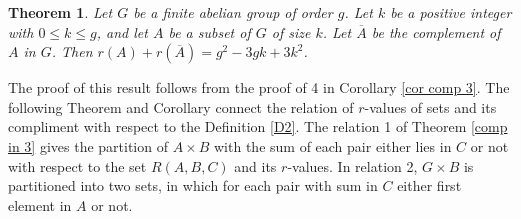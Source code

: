 \documentclass[12pt,a4paper]{article}
\newtheorem{thm}{Theorem}[section]
\begin{document}
	\begin{thm}\label{compliment}
		\cite{HUCZYNSKA2009831} Let $ G $ be a finite abelian group of order $ g $. Let $ k $ be a positive integer with $ 0\leq k\leq g $, and let $ A $
		be a subset of $ G $ of size $k $. Let $ \overline{A} $ be the complement of $ A $ in $ G $. Then $ r(A)+r(\overline{A})=g^2-3gk+3k^2 $.
	\end{thm} 
	The proof of this result follows from the proof of 4 in Corollary \ref{cor comp 3}. The following Theorem and Corollary connect the relation of $r$-values of sets and its compliment with respect to the Definition \ref{D2}. The relation 1 of Theorem \ref{comp in 3} gives the partition of $A\times B$ with the sum of each pair either lies in $C$ or not with respect to the set $R(A,B,C)$ and its $r$-values. In relation 2, $G\times B$ is partitioned into two sets, in which for each pair with sum in $C$ either first element in $A$ or not.
	
\end{document}
